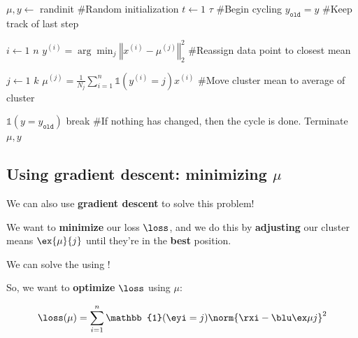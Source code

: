        \begin{codebox}
          \li $\mu, y \gets $ randinit  \qquad\#Random initialization
          \li \For $t \gets 1$ \To $\tau$   \qquad\#Begin cycling
          \li
          \li   \Do
                 $y_{\texttt{old}} = y$ \qquad\#Keep track of last step
                 
          \li
          \li        \For $i \gets 1$ \To $n$
          \li       \Do
                     $y^{(i)} = \arg\min_j \left\Vert x^{(i)} - \mu^{(j)} \right\Vert_2^2$
                     \qquad\#Reassign data point to closest mean
                    \End
                    
          \li
          \li    \For $j \gets 1$ \To $k$
          \li       \Do 
                     $\mu^{(j)} = \frac{1}{N_j} \sum_{i=1}^n \mathbb{1}(y^{(i)} = j) x^{(i)}$
                     \qquad\#Move cluster mean to average of cluster
                    \End
                    
        \li
          \li      \If $\mathbb{1}(y = y_{\texttt{old}})$
          \li          \Then
        		  break \qquad\#If nothing has changed, then the cycle is done. Terminate
              \End
              \End
          \li
          \li \Return $\mu, y$
        \end{codebox}
        
    \subsection{Using gradient descent: minimizing $\mu$}
    
        We can also use \textbf{gradient descent} to solve this problem!
        
        We want to \textbf{minimize} our loss $\loss$, and we do this by \textbf{adjusting} our cluster means $\ex{\mu}{j}$ until they're in the \textbf{best} position.\\
        
        \begin{concept}
            We can solve the  using !
        \end{concept}
        
        So, we want to \textbf{optimize} $\loss$ using $\mu$:
        
        \begin{equation}
            \loss(\mu) =
            \sum_{i=1}^n 
                    \mathbb{1}(\eyi = j)
                    \norm{ \rxi - \bmuj }^2 
        \end{equation}
        
